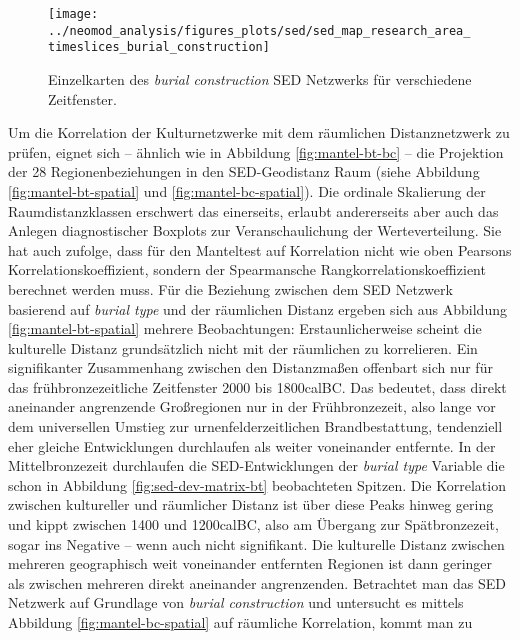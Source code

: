 \documentclass[openany,twoside,twocolumn]{book}
\begin{document}
\begin{landscape}
\begin{figure}
\texttt{[image: ../neomod\_analysis/figures\_plots/sed/sed\_map\_research\_area\_timeslices\_burial\_construction]} \caption[Einzelkarten des \textit{burial construction} SED Netzwerks für verschiedene Zeitfenster]{Einzelkarten des \textit{burial construction} SED Netzwerks für verschiedene Zeitfenster.}\label{fig:map-sed-bc}
\end{figure}
\end{landscape}

Um die Korrelation der Kulturnetzwerke mit dem räumlichen
Distanznetzwerk zu prüfen, eignet sich -- ähnlich wie in Abbildung
\ref{fig:mantel-bt-bc} -- die Projektion der 28 Regionenbeziehungen in
den SED-Geodistanz Raum (siehe Abbildung \ref{fig:mantel-bt-spatial} und
\ref{fig:mantel-bc-spatial}). Die ordinale Skalierung der
Raumdistanzklassen erschwert das einerseits, erlaubt andererseits aber
auch das Anlegen diagnostischer Boxplots zur Veranschaulichung der
Werteverteilung. Sie hat auch zufolge, dass für den Manteltest auf
Korrelation nicht wie oben Pearsons Korrelationskoeffizient, sondern der
Spearmansche Rangkorrelationskoeffizient berechnet werden muss. Für die
Beziehung zwischen dem SED Netzwerk basierend auf \emph{burial type} und
der räumlichen Distanz ergeben sich aus Abbildung
\ref{fig:mantel-bt-spatial} mehrere Beobachtungen: Erstaunlicherweise
scheint die kulturelle Distanz grundsätzlich nicht mit der räumlichen zu
korrelieren. Ein signifikanter Zusammenhang zwischen den Distanzmaßen
offenbart sich nur für das frühbronzezeitliche Zeitfenster 2000 bis
1800calBC. Das bedeutet, dass direkt aneinander angrenzende Großregionen
nur in der Frühbronzezeit, also lange vor dem universellen Umstieg zur
urnenfelderzeitlichen Brandbestattung, tendenziell eher gleiche
Entwicklungen durchlaufen als weiter voneinander entfernte. In der
Mittelbronzezeit durchlaufen die SED-Entwicklungen der \emph{burial
type} Variable die schon in Abbildung \ref{fig:sed-dev-matrix-bt}
beobachteten Spitzen. Die Korrelation zwischen kultureller und
räumlicher Distanz ist über diese Peaks hinweg gering und kippt zwischen
1400 und 1200calBC, also am Übergang zur Spätbronzezeit, sogar ins
Negative -- wenn auch nicht signifikant. Die kulturelle Distanz zwischen
mehreren geographisch weit voneinander entfernten Regionen ist dann
geringer als zwischen mehreren direkt aneinander angrenzenden.
Betrachtet man das SED Netzwerk auf Grundlage von \emph{burial
construction} und untersucht es mittels Abbildung
\ref{fig:mantel-bc-spatial} auf räumliche Korrelation, kommt man zu
\end{document}
